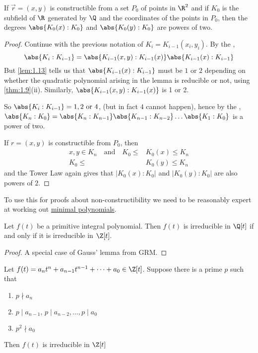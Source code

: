\documentclass{article}
\begin{document}
\begin{nthm}\label{thm:1.14}
    If $\vec{r} = (x, y)$ is constructible from a set $P_0$ of points in $\R^2$ and if $K_0$ is the subfield of $\R$ generated by $\Q$ and the coordinates of the points in $P_0$, then the degrees $\abs{K_0(x) : K_0}$ and $\abs{K_0(y):K_0}$ are powers of two.
\end{nthm}

\begin{proof}
    Continue with the previous notation of $K_i = K_{i-1}(x_i, y_i)$. By the ,
    \begin{equation*}
        \abs{K_i : K_{i-1}} = \abs{K_{i-1} (x, y): K_{i-1}(x)} \abs{K_{i-1}(x) : K_{i-1}}
    \end{equation*}
    But \cref{lem:1.13} tells us that $\abs{K_{i-1}(x):K_{i-1}}$ must be $1$ or $2$ depending on whether the quadratic polynomial arising in the lemma is reducible or not, using \cref{thm:1.9}(ii). Similarly, $\abs{K_{i-1}(x, y):K_{i-1}(x)}$ is 1 or 2.

    So $\abs{K_i: K_{i-1}} = 1, 2 \ \text{or} \ 4$, (but in fact $4$ cannot happen), hence by the , $\abs{K_n:K_0} = \abs{K_n:K_{n-1}} \abs{K_{n-1} : K_{n-2}} \dots \abs{K_1:K_0}$ is a power of two.

    If $r = (x, y)$ is constructible from $P_0$, then
    \begin{align*}
        x, y \in K_n \quad \text{and} \quad K_0 \leq &K_0(x) \leq K_n \\
        K_0 \leq &K_0(y) \leq K_n
    \end{align*}
    and the Tower Law again gives that $|K_0(x):K_0|$ and $|K_0(y):K_0|$ are also powers of $2$.
\end{proof}

To use this for proofs about non-constructibility we need to be reasonably expert at working out \hyperlink{def:minimalPoly}{minimal polynomials}.

\begin{nthm}\label{thm:1.15}
    Let $f(t)$ be a primitive integral polynomial.  Then $f(t)$ is irreducible in $\Q[t]$ if and only if it is irreducible in $\Z[t]$.
\end{nthm}

\begin{proof}
    A special case of Gauss' lemma from GRM.
\end{proof}

\begin{nthm}\label{thm:1.16}
    Let $f(t) = a_n t^n + a_{n-1} t^{n-1} + \dots + a_0 \in \Z[t]$.
    Suppose there is a prime $p$ such that
    \begin{enumerate}[label=(\roman*)]
        \item $p \nmid a_n$
        \item $p \mid a_{n-1}, \, p \mid a_{n-2}, \dotsc, p \mid a_0$
        \item $p^2 \nmid a_0$
    \end{enumerate}
    Then $f(t)$ is irreducible in $\Z[t]$
\end{nthm}
\end{document}
